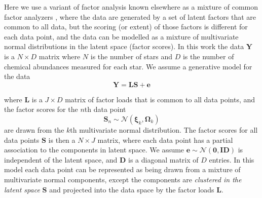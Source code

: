 \documentclass[twocolumn]{aastex61}
\newcommand{\vect}[1]{\boldsymbol{\mathbf{#1}}}
\renewcommand{\vec}[1]{\vect{#1}}
\newcommand{\data}{\textbf{Y}}
\newcommand{\vecdata}{\vec\data}
\newcommand{\eye}{\textbf{I}}
\newcommand{\factorloads}{\textbf{L}}
\newcommand{\factorscores}{\textbf{S}}
\newcommand{\specificvariance}{\vec{D}}
\newcommand{\NumData}{N}
\newcommand{\NumDimensions}{D}
\newcommand{\numdata}{n}
\newcommand{\NumLatentFactors}{J}
\newcommand{\numcomponents}{k}
\begin{document}
Here we use a variant of factor analysis known elsewhere as a mixture of common 
factor analyzers \citep{Baek:2010}, where the data are generated by a set of 
latent factors that are common to all data, but the scoring (or extent) of those
factors is different for each data point, and the data can be modelled as a
mixture of multivariate normal distributions in the latent space (factor scores).
In this work the data $\vecdata$ is a 
$\NumData \times \NumDimensions$ matrix where $\NumData$ is the number of 
stars and $\NumDimensions$ is the number of chemical abundances measured 
for each star. We assume a generative model for the data 
\begin{equation}
	\vecdata = \factorloads\factorscores + \vec{e}
	\label{eq:generative-model}
\end{equation}

\noindent{}where $\factorloads$ is a $\NumLatentFactors \times \NumDimensions$ 
matrix of factor loads that is common to all data points, and the factor scores 
for the $\numdata$th data point
\begin{equation}
	\factorscores_\numdata \sim \mathcal{N}(\vec\xi_\numcomponents, \vec\Omega_\numcomponents)
\end{equation}
\noindent{}are drawn from the $\numcomponents$th multivariate normal distribution.
The factor scores for all data points $\factorscores$ is then a 
$\NumData \times \NumLatentFactors$ matrix, where each data point has a partial
association to the components in latent space. 
We assume $\vec{e} \sim \mathcal{N}\left(\vec{0}, \eye\specificvariance\right)$
is independent of the latent space, and $\specificvariance$ is a
diagonal matrix of $\NumDimensions$ entries. 
In this model each data point can be represented as being drawn
from a mixture of multivariate normal components, except the components
are \emph{clustered in the latent space} $\factorscores$ and projected
into the data space by the factor loads $\factorloads$. 
\end{document}

